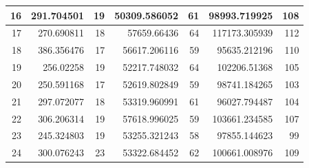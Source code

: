 \begin{table}
\begin{adjustwidth}{}{}
{{\begin{tabular}{|r|r|r|r|r|r|r|}
					\hline
					16                                         & 291.704501                   & 19                                    & 50309.586052                   & 61                                    & 98993.719925                 & 108                                    \\ 
					\hline
					17                                         & 270.690811                   & 18                                    & 57659.66436                    & 64                                    & 117173.305939                & 112                                    \\ 
					\hline
					18                                         & 386.356476                   & 17                                    & 56617.206116                   & 59                                    & 95635.212196                 & 110                                    \\ 
					\hline
					19                                         & 256.02258                    & 19                                    & 52217.748032                   & 64                                    & 102206.51368                 & 105                                    \\ 
					\hline
					20                                         & 250.591168                   & 17                                    & 52619.802849                   & 59                                    & 98741.184265                 & 103                                    \\ 
					\hline
					21                                         & 297.072077                   & 18                                    & 53319.960991                   & 61                                    & 96027.794487                 & 104                                    \\ 
					\hline
					22                                         & 306.206314                   & 19                                    & 57618.996025                   & 59                                    & 103661.234585                & 107                                    \\ 
					\hline
					23                                         & 245.324803                   & 19                                    & 53255.321243                   & 58                                    & 97855.144623                 & 99                                     \\ 
					\hline
					24                                         & 300.076243                   & 23                                    & 53322.684452                   & 62                                    & 100661.008976                & 109                                    \\ 

\end{tabular}}}
\end{adjustwidth}
\end{table}
